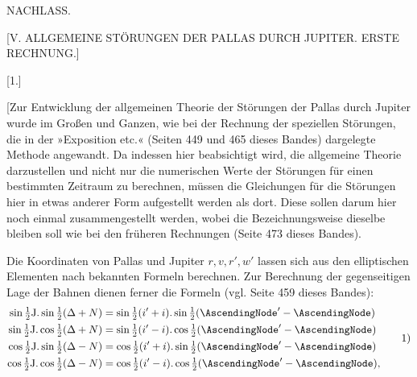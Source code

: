 \clearpage
{}
\begin{center}
{\Large NACHLASS.\par}
\bigskip
{\large [V. ALLGEMEINE STÖRUNGEN DER PALLAS DURCH JUPITER. ERSTE RECHNUNG.]\par}
\par
\end{center}
\par{}\bigskip
{}
\begin{center}[1.]\end{center}
\begingroup
\makeatletter\tagsleft@true\let\veqno\@@leqno\makeatother
\setlength{\lineskip}{4pt}\setlength{\lineskiplimit}{4pt}
\newcommand{\VonePallasMarks}{\makebox[.16em][l]{\raisebox{1.35ex}{\rule{.07em}{.07em}}}\kern-.16em\makebox[.16em][l]{\raisebox{-.5ex}{\rule{.14em}{.035em}}}}
\noindent\hspace*{\parindent}[Zur Entwicklung der allgemeinen Theorie der Störungen der Pallas durch Jupiter wurde im Großen und Ganzen, wie bei der Rechnung der speziellen Störungen, die in der »Exposition etc.« (Seiten 449 und 465 dieses Bandes) dargelegte Methode angewandt. Da indessen hier beabsichtigt wird, die allgemeine Theorie darzustellen und nicht nur die numerischen Werte der Störungen für einen bestimmten Zeitraum zu berechnen, müssen die Gleichungen für die Störungen hier in etwas anderer Form aufgestellt werden als dort. Diese sollen darum hier noch einmal zusammengestellt werden, wobei die Bezeichnungsweise dieselbe bleiben soll wie bei den früheren Rechnungen (Seite 473 dieses Bandes).
\par
Die Koordinaten von Pallas und Jupiter \(r,v,r',w'\) lassen sich aus den elliptischen Elementen nach bekannten Formeln berechnen. Zur Berechnung der gegenseitigen Lage der Bahnen dienen ferner die Formeln (vgl. Seite 459 dieses Bandes):
\[
\begin{aligned}
\sin\tfrac12\mathrm{J}.\sin\tfrac12(\Delta+N)&=\sin\tfrac12(i'+i).\sin\tfrac12(\AscendingNode'-\AscendingNode)\\
\sin\tfrac12\mathrm{J}.\cos\tfrac12(\Delta+N)&=\sin\tfrac12(i'-i).\cos\tfrac12(\AscendingNode'-\AscendingNode)\\
\cos\tfrac12\mathrm{J}.\sin\tfrac12(\Delta-N)&=\cos\tfrac12(i'+i).\sin\tfrac12(\AscendingNode'-\AscendingNode)\\
\cos\tfrac12\mathrm{J}.\cos\tfrac12(\Delta-N)&=\cos\tfrac12(i'-i).\cos\tfrac12(\AscendingNode'-\AscendingNode),
\end{aligned}
\tag*{1)}
\]
